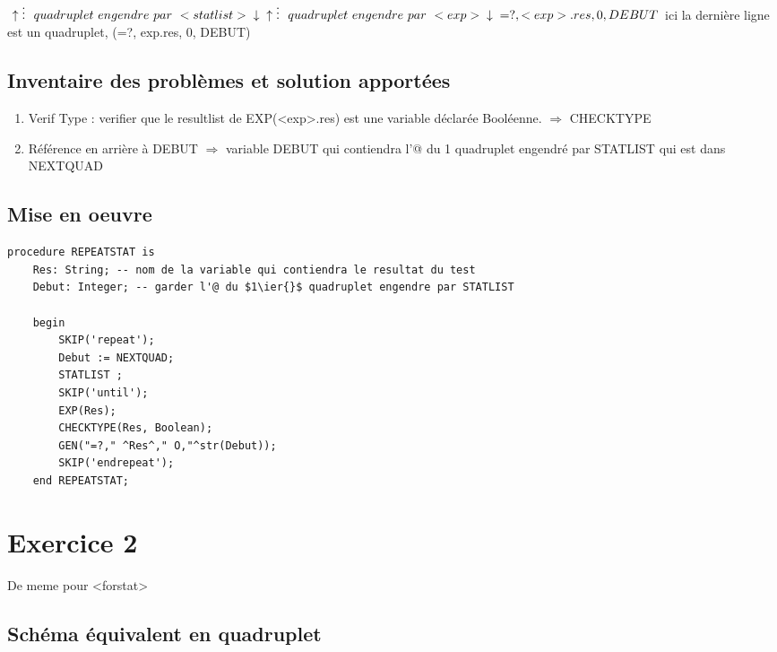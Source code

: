 \documentclass[10pt,a4paper]{article}
\begin{document}
$\\
\uparrow \\
\vdots \ \ quadruplet\  engendre\ par\ <statlist>\\
\downarrow\\
\uparrow \\
\vdots \ \ quadruplet\  engendre\ par\ <exp>\\
\downarrow\\
=?, <exp>.res, 0, DEBUT
$
ici la dernière ligne est un quadruplet, (=?, exp.res, 0, DEBUT)

\subsection*{Inventaire des problèmes et solution apportées}

\begin{enumerate}
\item Verif Type : verifier que le resultlist de EXP(<exp>.res) est une variable déclarée Booléenne. 
$\Rightarrow$ CHECKTYPE
\item Référence en arrière à DEBUT
$\Rightarrow$ variable DEBUT qui contiendra l'@ du 1\ier{} quadruplet engendré par STATLIST qui est dans NEXTQUAD
\end{enumerate}

\subsection*{Mise en oeuvre }
\begin{lstlisting}[language=Algo, framerule=0pt,  numbers=none]
procedure REPEATSTAT is
	Res: String; -- nom de la variable qui contiendra le resultat du test
	Debut: Integer; -- garder l'@ du $1\ier{}$ quadruplet engendre par STATLIST
	
	begin
		SKIP('repeat');
		Debut := NEXTQUAD;
		STATLIST ;
		SKIP('until');
		EXP(Res);
		CHECKTYPE(Res, Boolean);
		GEN("=?," ^Res^," O,"^str(Debut));
		SKIP('endrepeat');
	end REPEATSTAT;
\end{lstlisting}

\section*{Exercice 2}
De meme pour <forstat>

\subsection*{Schéma équivalent en quadruplet}
\end{document}
